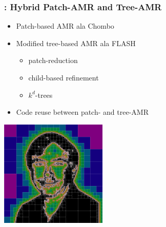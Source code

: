 \begin{frame}[fragile] \frametitle{\cello: Hybrid Patch-AMR and Tree-AMR}

\begin{minipage}{2in}
\begin{itemize}
\item Patch-based AMR ala Chombo
\item Modified tree-based AMR ala FLASH
\begin{itemize}
\item patch-reduction
\item child-based refinement
\item $k^d$-trees
\end{itemize}
\item Code reuse between patch- and tree-AMR
\end{itemize}
\end{minipage}
\begin{minipage}{2.0in}
\centerline{\includegraphics[width=2.0in]{norman.png}}
\end{minipage}
\end{frame}
